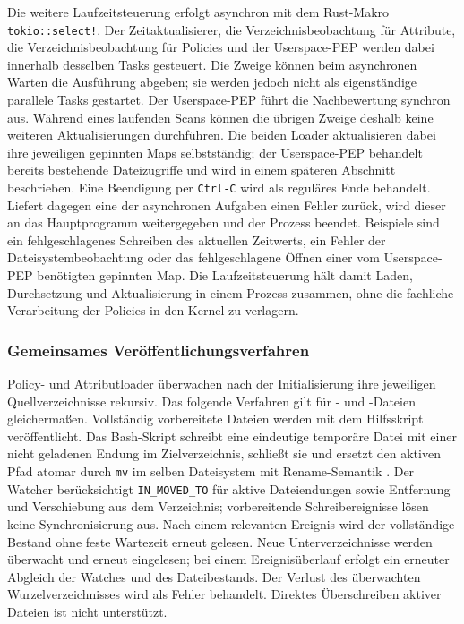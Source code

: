Die weitere Laufzeitsteuerung erfolgt asynchron mit dem Rust-Makro \texttt{tokio::select!}. Der Zeitaktualisierer, die Verzeichnisbeobachtung für Attribute, die Verzeichnisbeobachtung für Policies und der Userspace-PEP werden dabei innerhalb desselben Tasks gesteuert. Die Zweige können beim asynchronen Warten die Ausführung abgeben; sie werden jedoch nicht als eigenständige parallele Tasks gestartet. Der Userspace-PEP führt die Nachbewertung synchron aus. Während eines laufenden Scans können die übrigen Zweige deshalb keine weiteren Aktualisierungen durchführen. Die beiden Loader aktualisieren dabei ihre jeweiligen gepinnten Maps selbstständig; der Userspace-PEP behandelt bereits bestehende Dateizugriffe und wird in einem späteren Abschnitt beschrieben. Eine Beendigung per \texttt{Ctrl-C} wird als reguläres Ende behandelt. Liefert dagegen eine der asynchronen Aufgaben einen Fehler zurück, wird dieser an das Hauptprogramm weitergegeben und der Prozess beendet. Beispiele sind ein fehlgeschlagenes Schreiben des aktuellen Zeitwerts, ein Fehler der Dateisystembeobachtung oder das fehlgeschlagene Öffnen einer vom Userspace-PEP benötigten gepinnten Map. Die Laufzeitsteuerung hält damit Laden, Durchsetzung und Aktualisierung in einem Prozess zusammen, ohne die fachliche Verarbeitung der Policies in den Kernel zu verlagern.

\subsubsection{Gemeinsames Veröffentlichungsverfahren}\label{sec:konfigurationsveroeffentlichung}
Policy- und Attributloader überwachen nach der Initialisierung ihre jeweiligen Quellverzeichnisse rekursiv. Das folgende Verfahren gilt für - und -Dateien gleichermaßen.
Vollständig vorbereitete Dateien werden mit dem Hilfsskript  veröffentlicht.
Das Bash-Skript schreibt eine eindeutige temporäre Datei mit einer nicht geladenen Endung im Zielverzeichnis,
schließt sie und ersetzt den aktiven Pfad atomar durch \texttt{mv} im selben Dateisystem mit Rename-Semantik \citep{manRename}.
Der Watcher berücksichtigt \texttt{IN\_MOVED\_TO} für aktive Dateiendungen sowie Entfernung und
Verschiebung aus dem Verzeichnis; vorbereitende Schreibereignisse lösen keine Synchronisierung aus.
Nach einem relevanten Ereignis wird der vollständige Bestand ohne feste Wartezeit erneut gelesen.
Neue Unterverzeichnisse werden überwacht und erneut eingelesen; bei einem Ereignisüberlauf erfolgt
ein erneuter Abgleich der Watches und des Dateibestands. Der Verlust des überwachten Wurzelverzeichnisses
wird als Fehler behandelt. Direktes Überschreiben aktiver Dateien ist nicht unterstützt.

